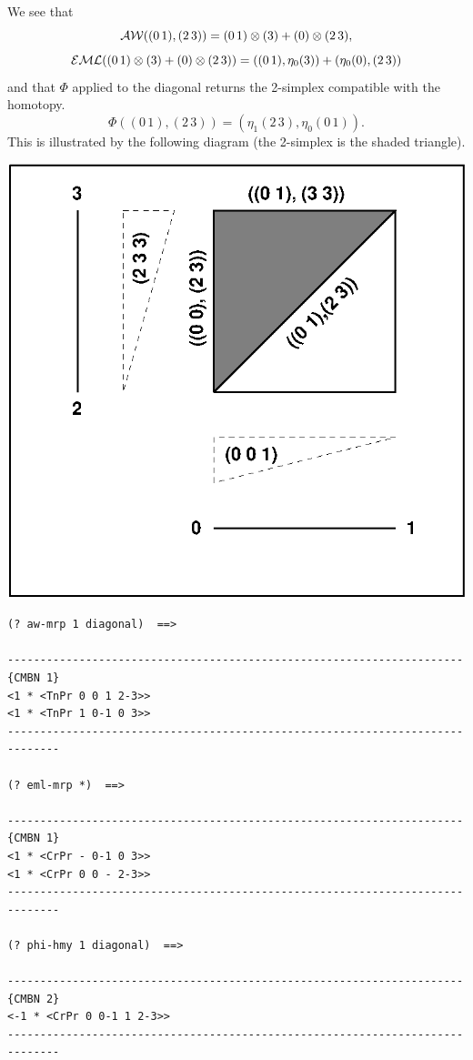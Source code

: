 We see that 
$$ {\cal AW}((0\, 1), (2\, 3)) = (0\, 1)\otimes (3) + (0) \otimes (2\, 3),$$
$$ {\cal EML}((0\, 1)\otimes (3) + (0) \otimes (2\, 3))= ((0\, 1), \eta_0 (3)) 
     + (\eta_0 (0), (2\, 3))$$
and that $\Phi$ applied to the diagonal returns the 2-simplex compatible
with the homotopy. 
$$\Phi((0\, 1), (2\, 3))= (\eta_1(2\, 3),\eta_0(0\, 1)).$$
This is illustrated by the following diagram (the 2-simplex is the shaded triangle).
\vskip 0.50cm
%
\centerline{\includegraphics{eml3.eps}}
%
\vskip 0.50cm
{\footnotesize\begin{verbatim}
(? aw-mrp 1 diagonal)  ==>

----------------------------------------------------------------------{CMBN 1}
<1 * <TnPr 0 0 1 2-3>>
<1 * <TnPr 1 0-1 0 3>>
------------------------------------------------------------------------------

(? eml-mrp *)  ==>

----------------------------------------------------------------------{CMBN 1}
<1 * <CrPr - 0-1 0 3>>
<1 * <CrPr 0 0 - 2-3>>
------------------------------------------------------------------------------

(? phi-hmy 1 diagonal)  ==>

----------------------------------------------------------------------{CMBN 2}
<-1 * <CrPr 0 0-1 1 2-3>>
------------------------------------------------------------------------------
\end{verbatim}}
